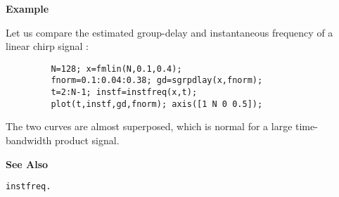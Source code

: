 {\bf \large {}\selectfont Example}\\
\hspace*{1.5cm}
\begin{minipage}[t]{13.5cm}
Let us compare the estimated group-delay and instantaneous frequency of a
linear chirp signal : 
\begin{verbatim}
         N=128; x=fmlin(N,0.1,0.4);
         fnorm=0.1:0.04:0.38; gd=sgrpdlay(x,fnorm); 
         t=2:N-1; instf=instfreq(x,t);
         plot(t,instf,gd,fnorm); axis([1 N 0 0.5]); 
\end{verbatim}
The two curves are almost superposed, which is normal for a large
time-bandwidth product signal.
\end{minipage}
\vspace*{.5cm}

{\bf \large {}\selectfont See Also}\\
\hspace*{1.5cm}
\begin{minipage}[t]{13.5cm}
\begin{verbatim}
instfreq.
\end{verbatim}
\end{minipage}
